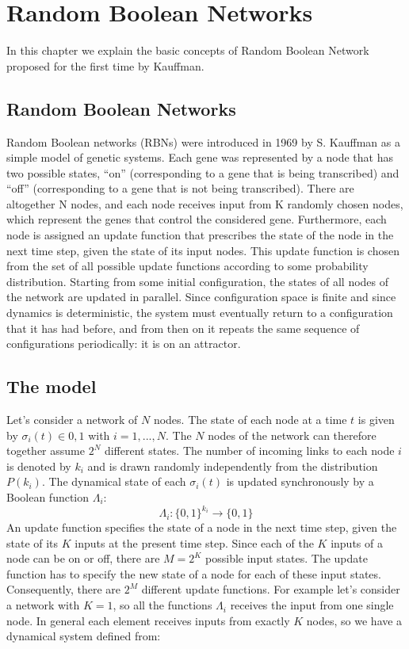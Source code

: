 \chapter{Random Boolean Networks}\label{rbn}
\lhead[\fancyplain{}{\bfseries\thepage}]{\fancyplain{}{\bfseries\rightmark}}


In this chapter we explain the basic concepts of Random Boolean Network proposed for the first time by Kauffman.

\section{Random Boolean Networks}
Random Boolean networks (RBNs) were introduced in
1969 by S. Kauffman as a simple model of genetic systems.
Each gene was represented by a node
that has two possible states, “on” (corresponding to a
gene that is being transcribed) and “off” (corresponding
to a gene that is not being transcribed). There are altogether N nodes, and each node receives input from K
randomly chosen nodes, which represent the genes that
control the considered gene. Furthermore, each node is
assigned an update function that prescribes the state of
the node in the next time step, given the state of its input nodes. This update function is chosen from the set
of all possible update functions according to some probability distribution. Starting from some initial configuration, the states of all nodes of the network are updated
in parallel. Since configuration space is finite and since
dynamics is deterministic, the system must eventually return to a configuration that it has had before, and from
then on it repeats the same sequence of configurations
periodically: it is on an attractor.

\section{The model}
Let's consider a network of $N$ nodes. The state of each node at a time $t$ is given by $\sigma_i(t) \in {0,1}$ with $ i = 1,...,N$.
The $N$ nodes of the network can therefore together assume $2^N$ different states.
The number of incoming links to each node $i$  is denoted by $k_i$ and is drawn
randomly independently from the distribution $P(k_i)$.
The dynamical state of each $\sigma_i(t)$ is updated synchronously by a Boolean function $\Lambda_i$:
$$
\Lambda_i:\{0,1\}^{k_i} \to \{0,1\}
$$ 
An update function specifies
the state of a node in the next time step, given the state
of its $K$ inputs at the present time step. Since each of the
$K$ inputs of a node can be on or off, there are $M = 2^K$ possible input states.
The update function has to specify the new state of a node for each of these input states.
Consequently, there are $2^M$ different update functions.
For example let's consider a network with $K=1$, so all the functions $\Lambda_i$ receives the input from one single node. 
In general each element 
receives inputs from exactly $K$ nodes, so we have a dynamical system defined from:

